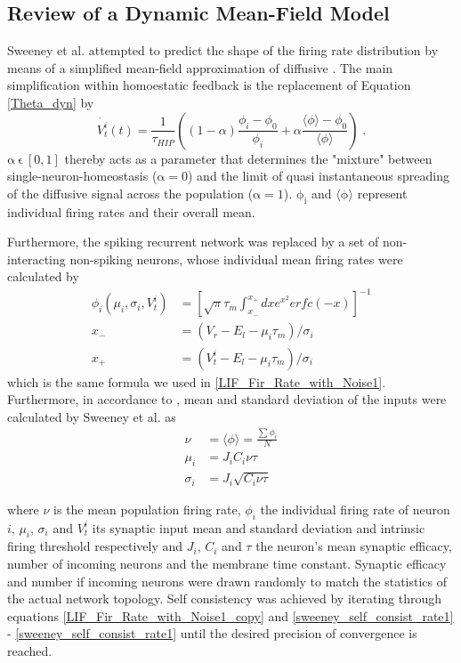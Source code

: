 \documentclass[10pt,a4paper]{article}
\begin{document}
\subsection{Review of a Dynamic Mean-Field Model}
Sweeney et al. attempted to predict the shape of the firing rate distribution by means of a simplified mean-field approximation of diffusive \cite{Sweeney_Paper}. The main simplification within homoestatic feedback is the replacement of Equation \ref{Theta_dyn} by
\begin{equation}
\dot{V_t^i}(t) = \frac{1}{\tau_{HIP}} \left( (1-\alpha)\frac{\phi_i-\phi_0}{\phi_i} +\alpha \frac{\langle \phi \rangle-\phi_0}{\langle \phi \rangle} \right)\;. 
\label{diff_hom_simpl_sweeney}
\end{equation}
$\mathrm{\alpha \: \epsilon \: [0,1]}$ thereby acts as a parameter that determines the "mixture" between single-neuron-homeostasis ($\mathrm{\alpha=0}$) and the limit of quasi instantaneous spreading of the diffusive signal across the population ($\mathrm{\alpha=1}$). $\mathrm{\phi_i}$ and $\mathrm{\mathrm{\langle \phi \rangle}}$ represent individual firing rates and their overall mean.

Furthermore, the spiking recurrent network was replaced by a set of non-interacting non-spiking neurons, whose individual mean firing rates were calculated by
\begin{align}
\phi_i(\mu_i,\sigma_i,V_t^i) &= \left[ \sqrt{\pi}\tau_m \int_{x_-}^{x_+} dx e^{x^2} erfc(-x) \right]^{-1} \label{LIF_Fir_Rate_with_Noise1_copy}\\
x_- &= (V_r-E_l-\mu_i\tau_m)/\sigma_i \label{LIF_Fir_Rate_with_Noise2_copy}\\
x_+ &= (V_t^i-E_l-\mu_i\tau_m)/\sigma_i \label{LIF_Fir_Rate_with_Noise3_copy}
\end{align}
which is the same formula we used in \eqref{LIF_Fir_Rate_with_Noise1}. Furthermore, in accordance to \cite{Roxin_Firing_Rate_Distribution}, mean and standard deviation of the inputs were calculated by Sweeney et al. as
\begin{align}
\nu &= \langle \phi \rangle = \frac{\sum \phi_i}{N} \label{sweeney_self_consist_rate1} \\
\mu_i &= J_iC_i\nu \tau \label{sweeney_self_consist_rate2} \\
\sigma_i &= J_i\sqrt{C_i\nu  \tau} \label{sweeney_self_consist_rate3}
\end{align}

where $\nu$ is the mean population firing rate, $\phi_i$ the individual firing rate of neuron $i$, $\mu_i$, $\sigma_i$ and $V_t^i$ its synaptic input mean and standard deviation and intrinsic firing threshold respectively and $J_i$, $C_i$ and $\tau$ the neuron's mean synaptic efficacy, number of incoming neurons and the membrane time constant. Synaptic efficacy and number if incoming neurons were drawn randomly to match the statistics of the actual network topology. Self consistency was achieved by iterating through equations \eqref{LIF_Fir_Rate_with_Noise1_copy} and \eqref{sweeney_self_consist_rate1} - \eqref{sweeney_self_consist_rate1} until the desired precision of convergence is reached.
\end{document}
